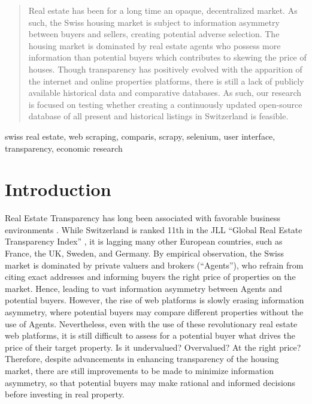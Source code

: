 \documentclass[main]{subfiles}
\begin{document}
\begin{abstract}
    Real estate has been for a long time an opaque, decentralized market. As such, the Swiss housing market is subject to information asymmetry between buyers and sellers, creating potential adverse selection. The housing market is dominated by real estate agents who possess more information than potential buyers which contributes to skewing the price of houses.
    Though transparency has positively evolved with the apparition of the internet and online properties platforms, there is still a lack of publicly available historical data and comparative databases.
    As such, our research is focused on testing whether creating a continuously updated open-source database of all present and historical listings in Switzerland is feasible. 
    
\end{abstract}
    
\begin{IEEEkeywords}
swiss real estate, web scraping, comparis, scrapy, selenium, user interface, transparency, economic research
\end{IEEEkeywords}
    
\section{Introduction}
Real Estate Transparency has long been associated with favorable business environments \cite{RealEstateTransparency}.
 While Switzerland is ranked 11th in the JLL “Global Real Estate Transparency Index” \cite{GlobalRealEstate}, 
 it is lagging many other European countries, such as France, the UK, Sweden, and Germany. 
By empirical observation, the Swiss market is dominated by private valuers and brokers (“Agents”), 
who refrain from citing exact addresses and informing buyers the right price of properties on the market. 
Hence, leading to vast information asymmetry between Agents and potential buyers.
However, the rise of web platforms is slowly erasing information asymmetry,
 where potential buyers may compare different properties without the use of Agents. 
 Nevertheless, even with the use of these revolutionary real estate web platforms, 
 it is still difficult to assess for a potential buyer what drives the price of their target property. 
 Is it undervalued? Overvalued? At the right price?
Therefore, despite advancements in enhancing transparency of the housing market, 
there are still improvements to be made to minimize information asymmetry, 
so that potential buyers may make rational and informed decisions before investing in real property.
\end{document}
